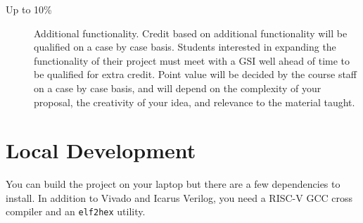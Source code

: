 \documentclass[11pt]{article}
\begin{document}
\begin{description}
  \item[Up to 10\%] Additional functionality. Credit based on additional functionality will be qualified on a case by case basis. Students interested in expanding the functionality of their project must meet with a GSI well ahead of time to be qualified for extra credit. Point value will be decided by the course staff on a case by case basis, and will depend on the complexity of your proposal, the creativity of your idea, and relevance to the material taught.
\end{description}

%

\newpage

\appendix
\section{Local Development}
You can build the project on your laptop but there are a few dependencies to install.
In addition to Vivado and Icarus Verilog, you need a RISC-V GCC cross compiler and an \verb|elf2hex| utility.
\end{document}

